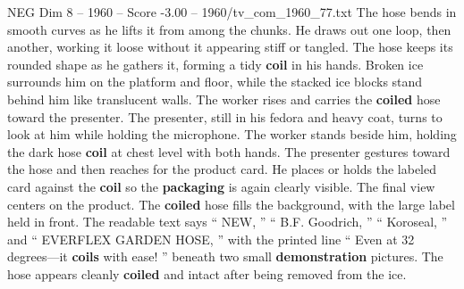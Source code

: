 \begin{textsample}{NEG Dim 8 – 1960 – Score -3.00 – 1960/tv\_com\_1960\_77.txt}
The hose bends in smooth curves as he lifts it from among the chunks.
He draws out one loop, then another, working it loose without it appearing stiff or tangled.
The hose keeps its rounded shape as he gathers it, forming a tidy \textbf{coil} in his hands.
Broken ice surrounds him on the platform and floor, while the stacked ice blocks stand behind him like translucent walls.
The worker rises and carries the \textbf{coiled} hose toward the presenter.
The presenter, still in his fedora and heavy coat, turns to look at him while holding the microphone.
The worker stands beside him, holding the dark hose \textbf{coil} at chest level with both hands.
The presenter gestures toward the hose and then reaches for the product card.
He places or holds the labeled card against the \textbf{coil} so the \textbf{packaging} is again clearly visible.
The final view centers on the product.
The \textbf{coiled} hose fills the background, with the large label held in front.
The readable text says “ NEW, ” “ B.F.
Goodrich, ” “ Koroseal, ” and “ EVERFLEX GARDEN HOSE, ” with the printed line “ Even at 32 degrees—it \textbf{coils} with ease! ” beneath two small \textbf{demonstration} pictures.
The hose appears cleanly \textbf{coiled} and intact after being removed from the ice.

\end{textsample}
